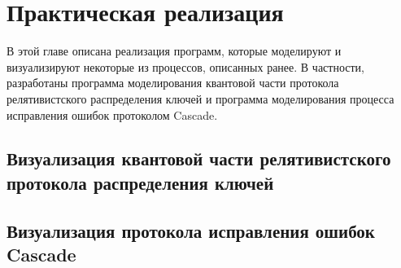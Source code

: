 \chapter{Практическая реализация}
В этой главе описана реализация программ, которые моделируют и визуализируют некоторые из процессов, описанных ранее. В частности, разработаны программа моделирования квантовой части протокола релятивистского распределения ключей и программа моделирования процесса исправления ошибок протоколом Cascade.



\section{Визуализация квантовой части релятивистского протокола распределения ключей}

\section{Визуализация протокола исправления ошибок Cascade}